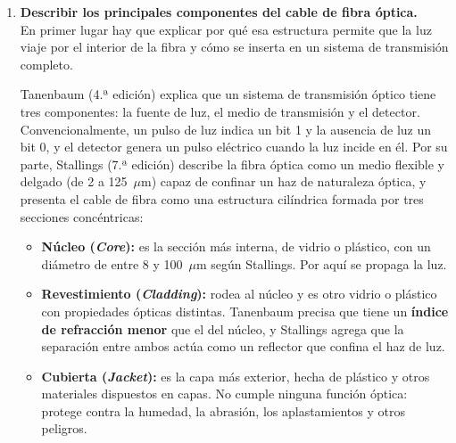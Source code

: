 \documentclass[11pt,a4paper]{article}
\begin{document}
\begin{enumerate}[label=4.\arabic*), itemsep=0.3cm]
        Ahora bien, esa mejora tiene un costo real, y no solo en dinero. Primero, el STP es efectivamente más caro: la Tabla 4.3 del libro, que compara categorías de cableado de cobre, muestra que si el UTP tipo 5 cuesta 1 (en unidades relativas), un STP tipo 7 (clase F) cuesta 2,2, más del doble. Segundo, es más difícil de instalar y manipular, porque la malla le agrega rigidez al cable, hace más delicado el conexionado (hay que aterrizar correctamente el blindaje en ambos extremos, si no se pierde buena parte del beneficio) y complica el tendido en espacios reducidos. Por eso, en la práctica, la preinstalación por defecto de la mayoría de los edificios de oficinas sigue siendo UTP, y el STP queda reservado para entornos con mucho ruido electromagnético o donde se necesitan las prestaciones más altas.
  \item
        \textbf {Describir los principales componentes del cable de fibra óptica.}\\
                                     En primer lugar hay que explicar por qué esa estructura permite que la luz viaje por el interior de la fibra y cómo se inserta en un sistema de transmisión completo.

        Tanenbaum (4.ª edición) explica que un sistema de transmisión óptico tiene tres componentes: la fuente de luz, el medio de transmisión y el detector. Convencionalmente, un pulso de luz indica un bit 1 y la ausencia de luz un bit 0, y el detector genera un pulso eléctrico cuando la luz incide en él. Por su parte, Stallings (7.ª edición) describe la fibra óptica como un medio flexible y delgado (de 2 a 125~$\mu$m) capaz de confinar un haz de naturaleza óptica, y presenta el cable de fibra como una estructura cilíndrica formada por tres secciones concéntricas:

        \begin{itemize}
          \item \textbf{Núcleo (\textit{Core}):} es la sección más interna, de vidrio o plástico, con un diámetro de entre 8 y 100~$\mu$m según Stallings. Por aquí se propaga la luz.

          \item \textbf{Revestimiento (\textit{Cladding}):} rodea al núcleo y es otro vidrio o plástico con propiedades ópticas distintas. Tanenbaum precisa que tiene un \textbf{índice de refracción menor} que el del núcleo, y Stallings agrega que la separación entre ambos actúa como un reflector que confina el haz de luz.

          \item \textbf{Cubierta (\textit{Jacket}):} es la capa más exterior, hecha de plástico y otros materiales dispuestos en capas. No cumple ninguna función óptica: protege contra la humedad, la abrasión, los aplastamientos y otros peligros.
        \end{itemize}


\end{enumerate}
\end{document}
